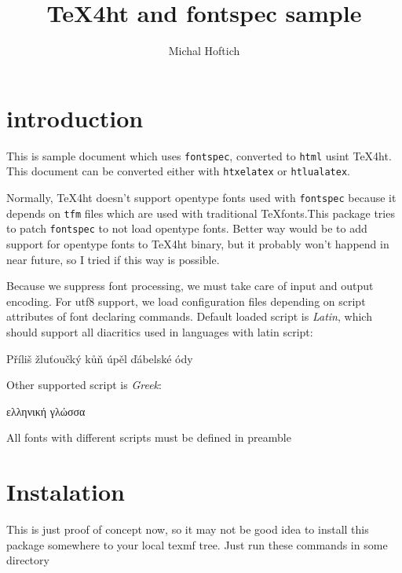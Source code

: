 \documentclass{article}
\begin{document}
	\title{TeX4ht and fontspec sample}
	\author{Michal Hoftich}
	\maketitle
	\section{introduction}

	This is sample document which uses \texttt{fontspec}, converted to 
	\verb|html| usint \TeX 4ht. This document can be converted either with 
	\verb|htxelatex| or \verb|htlualatex|. 

	Normally, \TeX 4ht doesn't support opentype fonts used with 
	\verb|fontspec| because it depends on \verb|tfm| files which are 
	used with traditional \TeX fonts.This package tries to patch 
	\verb|fontspec| to not load opentype fonts. 
	Better way would be to add support for opentype fonts to 
	\TeX 4ht binary, but it probably won't happend in near future, 
	so I tried if this way is possible.

	Because we suppress font processing, we must take care of input 
	and output encoding. For utf8 support, we load configuration files 
	depending on script attributes of font declaring commands. 
	Default loaded script is \emph{Latin}, which should support all diacritics 
	used in languages with latin script:

	Příliš žluťoučký kůň úpěl ďábelské ódy

	Other supported script is \emph{Greek}:

	\greekfont
	ελληνική γλώσσα

	All fonts with different scripts must be defined in preamble

	\section{Instalation}

	This is just proof of concept now, so it may not be good idea 
	to install this package somewhere to your local texmf tree. 
	Just run these commands in some directory
\end{document}
